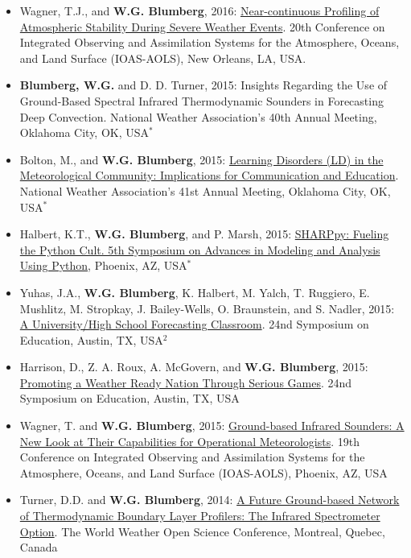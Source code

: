 \documentclass[10pt]{res} %
\begin{document}
\begin{resume}
\begin{itemize}
\item Wagner, T.J., and \textbf{W.G. Blumberg}, 2016: \href{https://ams.confex.com/ams/96Annual/webprogram/Paper289298.html}{Near-continuous Profiling of Atmospheric Stability During Severe Weather Events}.  20th Conference on Integrated Observing and Assimilation Systems for the Atmosphere, Oceans, and Land Surface (IOAS-AOLS), New Orleans, LA, USA.
\item \textbf{Blumberg, W.G.} and D. D. Turner, 2015: Insights Regarding the Use of Ground-Based Spectral Infrared Thermodynamic Sounders in Forecasting Deep Convection. National Weather Association's 40th Annual Meeting, Oklahoma City, OK, USA\textbf{$^{*}$}
\item Bolton, M., and \textbf{W.G. Blumberg}, 2015: \href{http://slideplayer.com/slide/9176419/}{Learning Disorders (LD) in the Meteorological Community: Implications for Communication and Education}. National Weather Association's 41st Annual Meeting, Oklahoma City, OK, USA$^{*}$
\item Halbert, K.T., \textbf{W.G. Blumberg}, and P. Marsh, 2015: \href{https://ams.confex.com/ams/95Annual/webprogram/Paper270233.html}{SHARPpy: Fueling the Python Cult. 5th Symposium on Advances in Modeling and Analysis Using Python}, Phoenix, AZ, USA$^{*}$
\item Yuhas, J.A., \textbf{W.G. Blumberg}, K. Halbert, M. Yalch, T. Ruggiero, E. Mushlitz, M. Stropkay, J. Bailey-Wells, O. Braunstein, and S. Nadler, 2015: \href{https://ams.confex.com/ams/95Annual/webprogram/Paper265787.html}{A University/High School Forecasting Classroom}. 24nd Symposium on Education, Austin, TX, USA$^{2}$
\item Harrison, D., Z. A. Roux, A. McGovern, and \textbf{W.G. Blumberg}, 2015: \href{https://ams.confex.com/ams/95Annual/webprogram/Paper259312.html}{Promoting a Weather Ready Nation Through Serious Games}. 24nd Symposium on Education, Austin, TX, USA
\item Wagner, T. and \textbf{W.G. Blumberg}, 2015: \href{https://ams.confex.com/ams/95Annual/webprogram/Paper260639.html}{Ground-based Infrared Sounders: A New Look at Their Capabilities for Operational Meteorologists}. 19th Conference on Integrated Observing and Assimilation Systems for the Atmosphere, Oceans, and Land Surface (IOAS-AOLS), Phoenix, AZ, USA
\item Turner, D.D. and \textbf{W.G. Blumberg}, 2014: \href{https://www.wmo.int/pages/prog/arep/wwrp/new/wwosc/documents/turner_profiling_vision_wwosc.pdf}{A Future Ground-based Network of Thermodynamic Boundary Layer Profilers: The Infrared Spectrometer Option}. The World Weather Open Science Conference, Montreal, Quebec, Canada

\end{itemize}
\end{resume}
\end{document}
